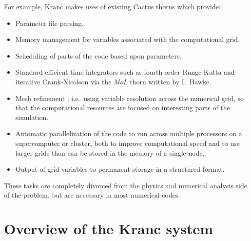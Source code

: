 \documentclass{report}
\begin{document}
For example, Kranc makes uses of existing Cactus thorns which provide:
\begin{itemize}
\item Parameter file parsing.
\item Memory management for variables associated with the
computational grid.
\item Scheduling of parts of the code based upon parameters.
\item Standard efficient time integrators such as fourth order
Runge-Kutta and iterative Crank-Nicolson via the {\em MoL} thorn
written by I.~Hawke.
\item Mesh refinement \cite{Schnetter}; i.e.~using variable resolution
across the numerical grid, so that the computational resources are
focused on interesting parts of the simulation.
\item Automatic parallelization of the code to run across multiple
processors on a supercomputer or cluster, both to improve
computational speed and to use larger grids than can be stored in the
memory of a single node.
\item Output of grid variables to permanent storage in a structured
format.
\end{itemize}
These tasks are completely divorced from the physics and numerical
analysis side of the problem, but are necessary in most numerical
codes.  
\section{Overview of the Kranc system}
\end{document}
